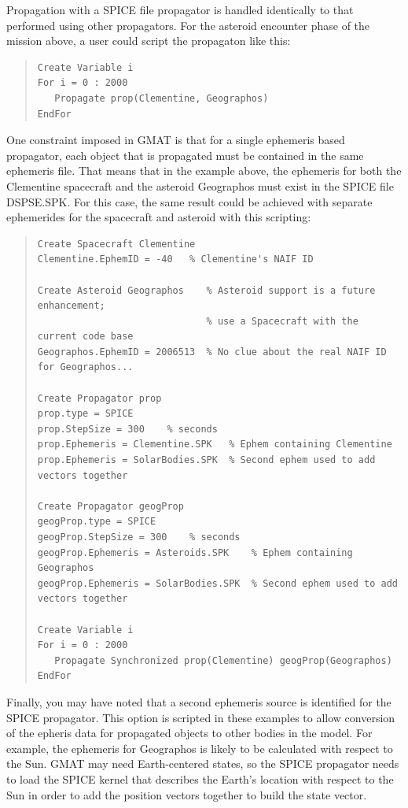 \noindent Propagation with a SPICE file propagator is handled identically to that performed using
other propagators.  For the asteroid encounter phase of the mission above, a user could script the
propagaton like this:

\begin{quote}
\begin{verbatim}
Create Variable i
For i = 0 : 2000
   Propagate prop(Clementine, Geographos)
EndFor
\end{verbatim}
\end{quote}

\noindent One constraint imposed in GMAT is that for a single ephemeris based propagator, each
object that is propagated must be contained in the same ephemeris file.  That means that in the
example above, the ephemeris for both the Clementine spacecraft and the asteroid Geographos must
exist in the SPICE file DSPSE.SPK.  For this case, the same result could be achieved with separate
ephemerides for the spacecraft and asteroid with this scripting:

\begin{quote}
\begin{verbatim}
Create Spacecraft Clementine
Clementine.EphemID = -40   % Clementine's NAIF ID

Create Asteroid Geographos    % Asteroid support is a future enhancement;
                              % use a Spacecraft with the current code base
Geographos.EphemID = 2006513  % No clue about the real NAIF ID for Geographos...

Create Propagator prop
prop.type = SPICE
prop.StepSize = 300    % seconds
prop.Ephemeris = Clementine.SPK   % Ephem containing Clementine
prop.Ephemeris = SolarBodies.SPK  % Second ephem used to add vectors together

Create Propagator geogProp
geogProp.type = SPICE
geogProp.StepSize = 300    % seconds
geogProp.Ephemeris = Asteroids.SPK    % Ephem containing Geographos
geogProp.Ephemeris = SolarBodies.SPK  % Second ephem used to add vectors together

Create Variable i
For i = 0 : 2000
   Propagate Synchronized prop(Clementine) geogProp(Geographos)
EndFor
\end{verbatim}
\end{quote}

\noindent Finally, you may have noted that a second ephemeris source is identified for the SPICE
propagator.  This option is scripted in these examples to allow conversion of the epheris data for
propagated objects to other bodies in the model.  For example, the ephemeris for Geographos is
likely to be calculated with respect to the Sun.  GMAT may need Earth-centered states, so the SPICE
propagator needs to load the SPICE kernel that describes the Earth's location with respect to the
Sun in order to add the position vectors together to build the state vector.

